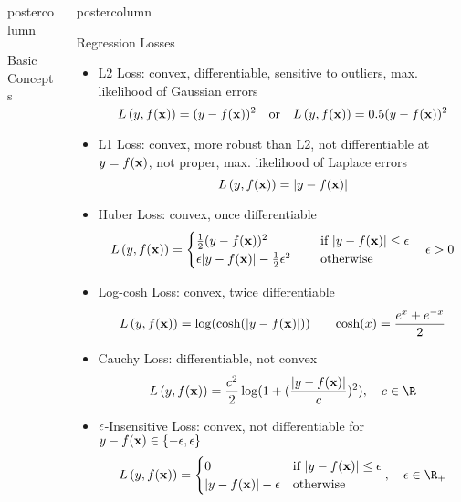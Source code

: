 \documentclass{beamer}
\newlength{\columnheight} %
\begin{document}
\begin{frame}[fragile]{}
\begin{columns}
\begin{column}{.31\textwidth}
\begin{beamercolorbox}[center]{postercolumn}
\begin{minipage}{.98\textwidth}
{\begin{myblock}{Basic Concepts}
							\end{myblock}\vfill
						}
					
			\end{minipage}
		\end{beamercolorbox}
	\end{column}
	

\begin{column}{.31\textwidth}
\begin{beamercolorbox}[center]{postercolumn}
\begin{minipage}{.98\textwidth}
\parbox[t][\columnheight]{\textwidth}{


\begin{myblock}{Regression Losses}

  \begin{itemize}[$\bullet$]
            \setlength{\itemindent}{+.3in}
        \item L2 Loss: convex, differentiable, sensitive to outliers, max. likelihood of Gaussian errors
        $$L\left(y, f(\mathbf{x})\right) = (y-f(\mathbf{x}))^2 \quad \text{or} \quad L\left(y, f(\mathbf{x})\right) = 0.5 (y-f(\mathbf{x}))^2$$

        \item L1 Loss: convex, more robust than L2, not differentiable at $y = f(\mathbf{x})$, not proper, max. likelihood of Laplace errors
        $$L\left(y, f(\mathbf{x})\right) = |y - f(\mathbf{x})|$$

        \item Huber Loss: convex, once differentiable
        $$L\left(y, f(\mathbf{x})\right) = \begin{cases}
              \frac{1}{2}(y - f(\mathbf{x}))^2  & \text{ if } |y - f(\mathbf{x})| \le \epsilon \\
              \epsilon |y - f(\mathbf{x})|-\frac{1}{2}\epsilon^2 \quad & \text{ otherwise }
              \end{cases} \quad \epsilon > 0$$

        \item Log-cosh Loss: convex, twice differentiable
        $$L\left(y, f(\mathbf{x})\right) = \log ( \cosh(|y - f(\mathbf{x})|) ) \qquad \text{cosh}(x)=\frac{e^x+e^{-x}}{2}$$
        
        \item Cauchy Loss: differentiable, not convex
        $$\Lxy = \frac{c^2}{2} \log ( 1 + ( \frac{|y - \fx|}{c})^2 ), \quad c \in \R$$
        
        \item $\epsilon$-Insensitive Loss: convex, not differentiable for $ y - f(\mathbf{x}) \in \{-\epsilon, \epsilon\}$
        $$\Lxy =  \begin{cases}
              0  & \text{if } |y - \fx| \le \epsilon \\
              |y - \fx|-\epsilon & \text{otherwise }
              \end{cases}, \quad \epsilon \in \R_{+}$$
        

\end{itemize}
\end{myblock}}
\end{minipage}
\end{beamercolorbox}
\end{column}
\end{columns}
\end{frame}
\end{document}
